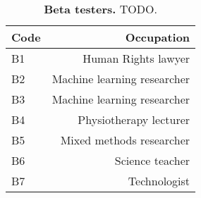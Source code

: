 \begin{table}[h]
\centering
\caption{\small \textbf{Beta testers.} TODO.}
\label{tab:continent_tally}
\begin{tabular}{lr} 
\\
\toprule
\textbf{Code}& \textbf{Occupation}   \\ 
\midrule
B1  & Human Rights lawyer \\
B2  &  Machine learning researcher  \\
B3  &  Machine learning researcher \\
B4  &  Physiotherapy lecturer     \\
B5 & Mixed methods researcher   \\
B6 & Science teacher    \\
B7 & Technologist    \\
 



\bottomrule
\end{tabular}
\end{table}
